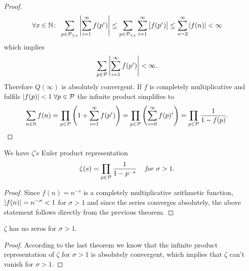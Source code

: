 \begin{proof}
\begin{equation*}
	\forall x \in \mathbb{N} \colon \; \sum_{p \in \mathcal{P}_{\leq x}} \left|\sum_{i = 1}^\infty f(p^i)\right| \leq \sum_{p \in \mathcal{P}_{\leq x}} \sum_{i = 1}^\infty \left|f(p^i)\right| \leq \sum_{n = 2}^\infty \left|f(n)\right| < \infty
\end{equation*}
	which implies
\begin{equation*}
	\sum_{p \in \mathcal{P}} \left|\sum_{i = 1}^\infty f(p^i)\right| < \infty.
\end{equation*}
	Therefore $Q(\infty)$ is absolutely convergent. If $f$ is completely multiplicative and fulfils $\left|f(p)\right| < 1 \; \forall p \in \mathcal{P}$ the infinite product simplifies to
\begin{equation*}
	\sum_{n \in \mathbb{N}} f(n) = \prod_{p \in \mathcal{P}} \left(1 + \sum_{i = 1}^\infty f(p^i)\right) = \prod_{p \in \mathcal{P}} \left(\sum_{i = 0}^\infty f(p)^i\right) = \prod_{p \in \mathcal{P}} \frac{1}{1 - f(p)}.
\end{equation*}
\end{proof}


\begin{corollary}
	We have $\zeta$'s Euler product representation
\begin{equation*}
	\zeta(s) = \prod_{p \in \mathcal{P}} \frac{1}{1 - p^{-s}} \hspace{0.3cm} \textit{ for } \sigma > 1.
\end{equation*}
\end{corollary}
\begin{proof}
	Since $f(n) = n^{-s}$ is a completely multiplicative arithmetic function, $\left|f(n)\right| = n^{-\sigma} < 1$ for $\sigma > 1$ and since the series converges absolutely, the above statement follows directly from the previous theorem.
\end{proof}


\begin{corollary}
	$\zeta$ has no zeros for $\sigma > 1$.
\end{corollary}
\begin{proof}	
	According to the last theorem we know that the infinite product representation of $\zeta$ for $\sigma > 1$ is absolutely convergent, which implies that $\zeta$ can't vanish for $\sigma > 1$. 
\end{proof}